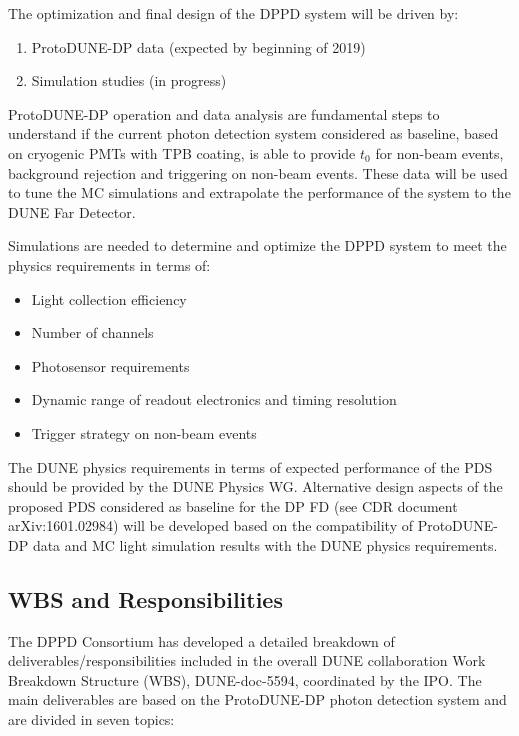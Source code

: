 The optimization and final design of the DPPD system will be driven by:
\begin{enumerate}
\item ProtoDUNE-DP data (expected by beginning of 2019)
\item Simulation studies (in progress)
\end{enumerate}

ProtoDUNE-DP operation and data analysis are fundamental steps to understand if the current photon detection system considered as baseline, based on cryogenic PMTs with TPB coating, is able to provide $t_0$ for non-beam events, background rejection and triggering on non-beam events. These data will be used to tune the MC simulations and extrapolate the performance of the system to the DUNE Far Detector. 

Simulations are needed to determine and optimize the DPPD system to meet the physics requirements in terms of:
\begin{itemize}
\item Light collection efficiency
\item Number of channels
\item Photosensor requirements
\item Dynamic range of readout electronics and timing resolution
\item Trigger strategy on non-beam events
\end{itemize}

The DUNE physics requirements in terms of expected performance of the PDS should be provided by the DUNE Physics WG. Alternative design aspects of the proposed PDS considered as baseline for the DP FD (see CDR document arXiv:1601.02984) will be developed based on the compatibility of ProtoDUNE-DP data and MC light simulation results with the DUNE physics requirements.

\subsection{WBS and Responsibilities}
\label{sec:fddp-pd-12.3}

The DPPD Consortium has developed a detailed breakdown of deliverables/responsibilities included in the overall DUNE collaboration Work Breakdown Structure (WBS), DUNE-doc-5594, coordinated by the IPO. The main deliverables are based on the ProtoDUNE-DP photon detection system and are divided in seven topics: 

